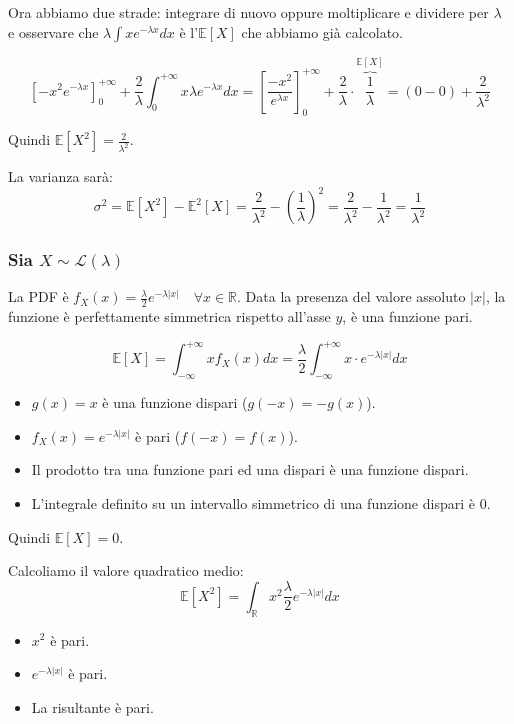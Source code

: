 Ora abbiamo due strade: integrare di nuovo oppure moltiplicare e dividere per $\lambda$ e osservare che $\lambda \int x e^{-\lambda x} dx$ è l'$\mathbb{E}[X]$ che abbiamo già calcolato.

\begin{equation}
\left[ -x^2 e^{-\lambda x} \right]_0^{+\infty} + \frac{2}{\lambda} \int_{0}^{+\infty} x \lambda e^{-\lambda x} dx = \left[ \frac{-x^2}{e^{\lambda x}} \right]_0^{+\infty} + \frac{2}{\lambda} \cdot \overbrace{ \frac{1}{\lambda} }^{\mathbb{E}[X]} = (0 - 0) + \frac{2}{\lambda^2}
\end{equation}

Quindi $\mathbb{E}[X^2] = \frac{2}{\lambda^2}$.

La varianza sarà:
\begin{equation}
\sigma^2 = \mathbb{E}[X^2] - \mathbb{E}^2[X] = \frac{2}{\lambda^2} - \left(\frac{1}{\lambda}\right)^2 = \frac{2}{\lambda^2} - \frac{1}{\lambda^2} = \frac{1}{\lambda^2}
\end{equation}


\subsubsection{Sia $X \sim \mathcal{L}(\lambda)$}

La PDF è $f_X(x) = \frac{\lambda}{2} e^{-\lambda |x|} \quad \forall x \in \mathbb{R}$.
Data la presenza del valore assoluto $|x|$, la funzione è perfettamente simmetrica rispetto all'asse $y$, è una funzione pari.

\begin{equation}
\mathbb{E}[X] = \int_{-\infty}^{+\infty} x f_X(x) dx = \frac{\lambda}{2} \int_{-\infty}^{+\infty} x \cdot e^{-\lambda |x|} dx
\end{equation}

\begin{itemize}
    \item $g(x) = x$ è una funzione dispari ($g(-x) = -g(x)$).
    \item $f_X(x) = e^{-\lambda |x|}$ è pari ($f(-x) = f(x)$).
    \item Il prodotto tra una funzione pari ed una dispari è una funzione dispari.
    \item L'integrale definito su un intervallo simmetrico di una funzione dispari è $0$.
\end{itemize}
Quindi $\mathbb{E}[X] = 0$.

Calcoliamo il valore quadratico medio:
\begin{equation}
\mathbb{E}[X^2] = \int_{\mathbb{R}} x^2 \frac{\lambda}{2} e^{-\lambda |x|} dx
\end{equation}
\begin{itemize}
    \item $x^2$ è pari.
    \item $e^{-\lambda |x|}$ è pari.
    \item La risultante è pari.
\end{itemize}

